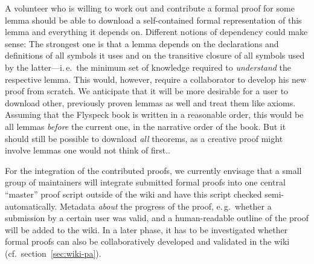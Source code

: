 \documentclass{llncs}
\begin{document}
A volunteer who is willing to work out and contribute a formal proof for some lemma should
be able to download a self-contained formal representation of this lemma and everything it
depends on.  Different notions of dependency could make sense: The strongest one is that a
lemma depends on the declarations and definitions of all symbols it uses and on the
transitive closure of all symbols used by the latter---i.\,e.\ the minimum set of
knowledge required to \emph{understand} the respective lemma.  This would, however,
require a collaborator to develop his new proof from scratch.  We anticipate that it will
be more desirable for a user to download other, previously proven
lemmas
as well and treat them like axioms.  Assuming that the Flyspeck book is
written in a reasonable order, this would be all lemmas \emph{before} the current one, in
the narrative order of the book.  But it should still be possible to download \emph{all}
theorems, as a creative proof might involve lemmas one would not think of
first..

For the integration of the contributed proofs, we currently envisage that a small group of
maintainers will integrate submitted formal proofs into one central ``master'' proof
script outside of the wiki and have this script checked semi-automatically.  Metadata
\emph{about} the progress of the proof, e.\,g.\ whether a submission by a certain user was
valid, and a human-readable outline of the proof will be added to the wiki.
In a later phase, it has to be investigated whether formal proofs can also be
collaboratively developed and validated in the wiki (cf.\ section~\ref{sec:wiki-pa}).
\end{document}

